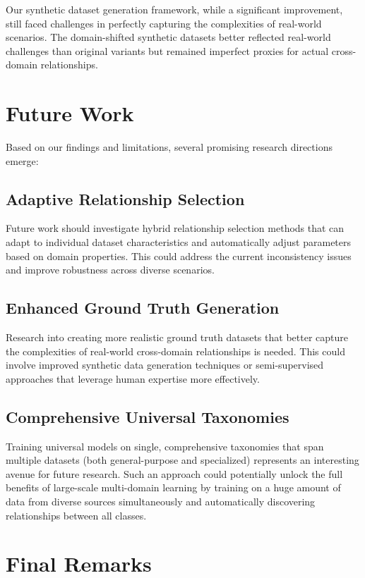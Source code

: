Our synthetic dataset generation framework, while a significant improvement,
still faced challenges in perfectly capturing the complexities of real-world scenarios.
The domain-shifted synthetic datasets better reflected real-world challenges
than original variants but remained imperfect proxies for actual cross-domain relationships.

\section{Future Work}

Based on our findings and limitations, several promising research directions emerge:

\subsection{Adaptive Relationship Selection}

Future work should investigate hybrid relationship selection methods
that can adapt to individual dataset characteristics
and automatically adjust parameters based on domain properties.
This could address the current inconsistency issues
and improve robustness across diverse scenarios.

\subsection{Enhanced Ground Truth Generation}

Research into creating more realistic ground truth datasets
that better capture the complexities of real-world cross-domain relationships is needed.
This could involve improved synthetic data generation techniques
or semi-supervised approaches that leverage human expertise more effectively.

\subsection{Comprehensive Universal Taxonomies}

Training universal models on single, comprehensive taxonomies
that span multiple datasets (both general-purpose and specialized)
represents an interesting avenue for future research.
Such an approach could potentially unlock the full benefits
of large-scale multi-domain learning by training on
a huge amount of data from diverse sources simultaneously
and automatically discovering relationships between all classes.

\section{Final Remarks}

